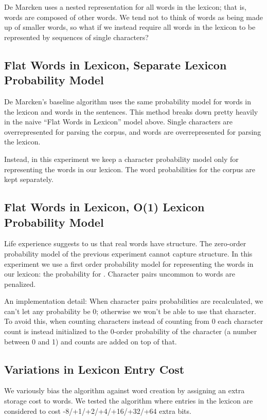 \documentclass[11pt, oneside, fleqn]{article}
\begin{document}
  De Marcken uses a nested representation for all words in the lexicon; that is, words are composed of other words. We tend not to think of words as being made up of smaller words, so what if we instead require all words in the lexicon to be represented by sequences of single characters?

  \subsection*{Flat Words in Lexicon, Separate Lexicon Probability Model}

	De Marcken's baseline algorithm uses the same probability model for words in the lexicon and words in the sentences. This method breaks down pretty heavily in the naive ``Flat Words in Lexicon'' model above. Single characters are overrepresented for parsing the corpus, and words are overrepresented for parsing the lexicon.
	
	Instead, in this experiment we keep a character probability model only for representing the words in our lexicon. The word probabilities for the corpus are kept separately.

  \subsection*{Flat Words in Lexicon, O(1) Lexicon Probability Model}

	Life experience suggests to us that real words have structure. The zero-order probability model of the previous experiment cannot capture structure. In this experiment we use a first order probability model for representing the words in our lexicon: the probability for . Character pairs uncommon to words are penalized.
	
	An implementation detail: When character pairs probabilities are recalculated, we can't let any probability be 0; otherwise we won't be able to use that character. To avoid this, when counting characters instead of counting from 0 each character count is instead initialized to the 0-order probability of the character (a number between 0 and 1) and counts are added on top of that.

	\subsection*{Variations in Lexicon Entry Cost}
	
	We variously bias the algorithm against word creation by assigning an extra storage cost to words. We tested the algorithm where entries in the lexicon are considered to cost -8/+1/+2/+4/+16/+32/+64 extra bits.
\end{document}
